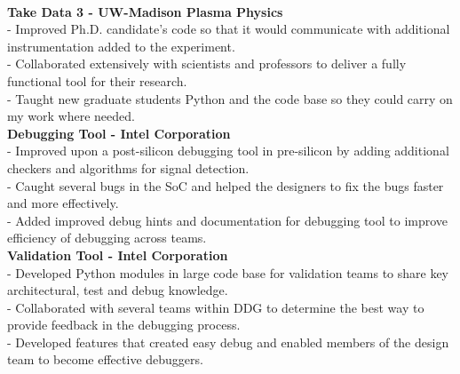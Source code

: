 \documentclass{resume}
\begin{document}
\begin{flushleft}
 \\[2mm]
\textbf{Take Data 3 - UW-Madison Plasma Physics} \\%
{\footnotesize
	\ttab- Improved Ph.D. candidate's code so that it would communicate with additional instrumentation added to the experiment. \\
	\ttab - Collaborated extensively with scientists and professors to deliver a fully functional tool for their research. \\
	\ttab - Taught new graduate students Python and the code base so they could carry on my work where needed. 
}
\\[2mm]
\textbf{Debugging Tool - Intel Corporation} \\%
{\footnotesize
	\ttab- Improved upon a post-silicon debugging tool in pre-silicon by adding additional checkers and algorithms for signal detection.\\
	\ttab- Caught several bugs in the SoC and helped the designers to fix the bugs faster and more effectively. \\
	\ttab- Added improved debug hints and documentation for debugging tool to improve efficiency of debugging across teams. \\[2mm]
}
\textbf{Validation Tool - Intel Corporation} \\
{\footnotesize
	\ttab- Developed Python modules in large code base for validation teams to share key architectural, test and debug knowledge. \\
	\ttab- Collaborated with several teams within DDG to determine the best way to provide feedback in the debugging process. \\
	\ttab -  Developed features that created easy debug and enabled members of the design team to become effective debuggers. \\[4mm]
}



\end{flushleft}
\end{document}
